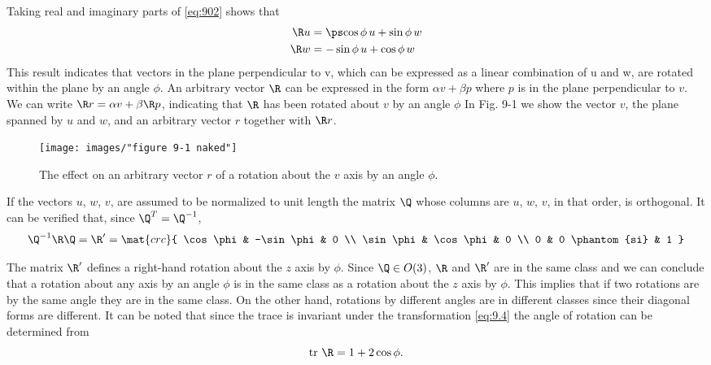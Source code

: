 Taking real and imaginary parts of \eqref{eq:902} shows that 
\begin{subequations}
\label{grp}
 \begin{align} 
   \R u &= \ps\!\cos \phi \, u + \sin \phi \, w \label{second}\\
   \R w &= -\sin \phi \, u + \cos \phi \, w \label{second}
 \end{align}
\end{subequations}
This result indicates that vectors in the plane perpendicular to v, which can be expressed as a linear combination of u and w, are rotated within the plane by an angle $\phi$. An arbitrary vector  $\R$ can be expressed in the form $\alpha v + \beta p$ where $p$ is in the plane perpendicular to $v$. We can write $\R r = \alpha v + \beta\R p$, indicating that  $\R$ has been rotated about $v$ by an angle $\phi$ In Fig. 9-1 we show the vector $v$, the plane spanned by $u$ and $w$, and an arbitrary vector  $r$ together with $\R r$.

\begin{figure}[htbp] %
   \centering
   \texttt{[image: images/"figure 9-1 naked"]} 
   \caption{The effect on an arbitrary vector $r$ of a rotation about the $v$ axis by an angle $\phi$.}
   \label{fig:9.1}
\end{figure}

If the vectors $u$, $w$, $v$, are assumed to be normalized to unit length the matrix $\Q$ whose columns are $u$, $w$, $v$, in that order, is orthogonal. It can be verified that, since $\Q^{T} = \Q^{-1}$,
\begin{equation}
  \Q^{-1} \R \Q = \R' = 
  \mat{crc}{
  \cos \phi & -\sin \phi & 0 \\
  \sin \phi &  \cos \phi & 0 \\
  0         &  0 \phantom{si}         & 1
  }
\label{eq:9.4}
\end{equation}

The matrix $\R'$ defines a right-hand rotation about the $z$ axis by $\phi$. Since $\Q \in O(3)$, $\R$ and $\R'$ are in the same class and we can conclude that a rotation about any axis by an angle $\phi$ is in the same class as a rotation about the $z$ axis by $\phi$. This implies that if two rotations are by the same angle they are in the same class. On the other hand, rotations by different angles are in different classes since their diagonal forms are different. It can be noted that since the trace is invariant under the transformation \eqref{eq:9.4} the angle of rotation can be determined from
\begin{equation}
  \text{tr } \R = 1 + 2 \cos \phi .
\label{eq:9.5}
\end{equation}

